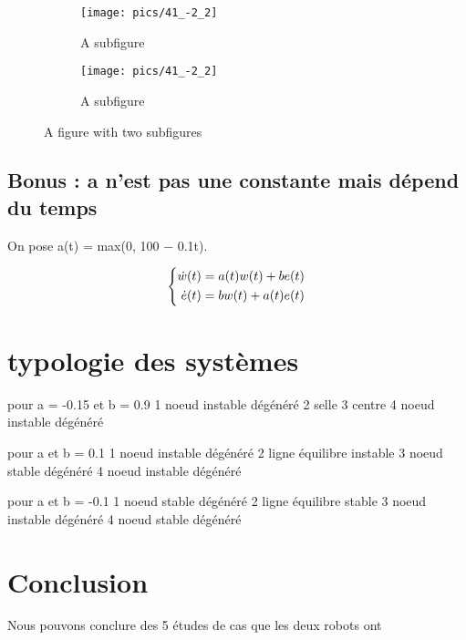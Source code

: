 \documentclass[utf8]{article}
\begin{document}
\begin{figure}
\centering
  \begin{subfigure}{.5\textwidth}
  \centering
  \texttt{[image: pics/41\_-2\_2]}
  \caption{A subfigure}
\end{subfigure}%
\begin{subfigure}{.5\textwidth}
  \centering
  \texttt{[image: pics/41\_-2\_2]}
  \caption{A subfigure}
\end{subfigure}
\caption{A figure with two subfigures}
\end{figure}

\newpage

\subsection{Bonus : a n’est pas une constante mais dépend du temps}

On pose a(t) = max(0, 100 − 0.1t).

\begin{equation}
\centering
\left\{\begin{split}
\dot{w}(t) &= a(t)w(t) + be(t)\\
\dot{e}(t) &= bw(t) + a(t)e(t) \\
\end{split}\right.
 \end{equation}

\section{typologie des systèmes}
pour a = -0.15 et b = 0.9
1 noeud instable dégénéré
2 selle
3 centre
4 noeud instable dégénéré

pour a et b = 0.1
1 noeud instable dégénéré
2 ligne équilibre instable
3 noeud stable dégénéré
4 noeud instable dégénéré

pour a et b = -0.1
1 noeud stable dégénéré
2 ligne équilibre stable
3 noeud instable dégénéré
4 noeud stable dégénéré

\newpage
\section{Conclusion}
Nous pouvons conclure des 5 études de cas que les deux robots ont
\end{document}
